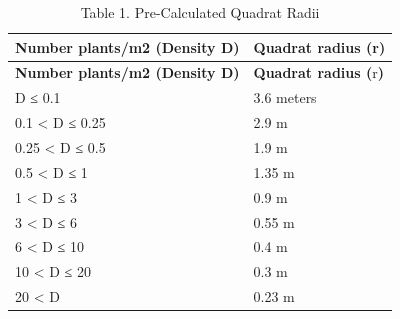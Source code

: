 \documentclass[
  letterpaper,
  DIV=11,
  numbers=noendperiod]{scrreprt}
\begin{document}
\begin{longtable}[]{@{}ll@{}}
\caption{Table 1. Pre-Calculated Quadrat Radii}\tabularnewline
\toprule\noalign{}
\textbf{Number plants/m2 (Density D)} & \textbf{Quadrat radius
(}r\textbf{)} \\
\midrule\noalign{}
\endfirsthead
\toprule\noalign{}
\textbf{Number plants/m2 (Density D)} & \textbf{Quadrat radius
(}r\textbf{)} \\
\midrule\noalign{}
\endhead
\bottomrule\noalign{}
\endlastfoot
D ≤ 0.1 & 3.6 meters \\
0.1 \textless{} D ≤ 0.25 & 2.9 m \\
0.25 \textless{} D ≤ 0.5 & 1.9 m \\
0.5 \textless{} D ≤ 1 & 1.35 m \\
1 \textless{} D ≤ 3 & 0.9 m \\
3 \textless{} D ≤ 6 & 0.55 m \\
6 \textless{} D ≤ 10 & 0.4 m \\
10 \textless{} D ≤ 20 & 0.3 m \\
20 \textless{} D & 0.23 m \\
\end{longtable}
\end{document}
